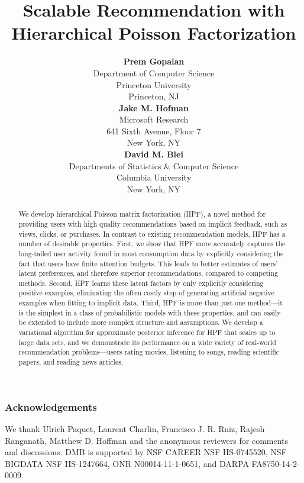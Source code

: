 \documentclass[]{article}
\title{Scalable Recommendation with Hierarchical Poisson
  Factorization}
\author{ {\bf Prem Gopalan} \\
Department of Computer Science \\
Princeton University \\
Princeton, NJ \\
\And
{\bf Jake M. Hofman} \\
Microsoft Research \\
641 Sixth Avenue, Floor 7 \\
New York, NY \\
\And
{\bf David M. Blei} \\
Departments of Statistics \& Computer Science \\
Columbia University \\
New York, NY \\
}
\begin{document}
\maketitle

\begin{abstract}
We develop hierarchical Poisson matrix factorization (HPF), a novel
method for providing users with high quality recommendations based on
implicit feedback, such as views, clicks, or purchases.  In contrast
to existing recommendation models, HPF has a number of desirable
properties.  First, we show that HPF more accurately captures the
long-tailed user activity found in most consumption data by explicitly
considering the fact that users have finite attention budgets.  This
leads to better estimates of users' latent preferences, and therefore
superior recommendations, compared to competing methods.  Second, HPF
learns these latent factors by only explicitly considering positive
examples, eliminating the often costly step of generating artificial
negative examples when fitting to implicit data.  Third, HPF is more
than just one method---it is the simplest in a class of probabilistic
models with these properties, and can easily be extended to include
more complex structure and assumptions.  We develop a variational
algorithm for approximate posterior inference for HPF that scales up
to large data sets, and we demonstrate its performance on a wide
variety of real-world recommendation problems---users rating movies,
listening to songs, reading scientific papers, and reading news
articles.  
\end{abstract}








\subsubsection*{Acknowledgements}
We thank Ulrich Paquet, Laurent Charlin, Francisco J. R. Ruiz, Rajesh
Ranganath, Matthew D. Hoffman and the anonymous reviewers for comments
and discussions. DMB is supported by NSF CAREER NSF IIS-0745520, NSF
BIGDATA NSF IIS-1247664, ONR N00014-11-1-0651, and DARPA
FA8750-14-2-0009.

\small{
  
  
}

\newpage
\appendix

\end{document}

